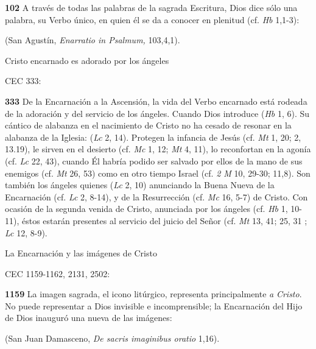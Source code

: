\textbf{102} A través de todas las palabras de la sagrada Escritura, Dios dice sólo una palabra, su Verbo único, en quien él se da a conocer en plenitud (cf. \emph{Hb} 1,1-3):

 (San Agustín, \emph{Enarratio in Psalmum,} 103,4,1).

Cristo encarnado es adorado por los ángeles

CEC 333:

\textbf{333} De la Encarnación a la Ascensión, la vida del Verbo encarnado está rodeada de la adoración y del servicio de los ángeles. Cuando Dios introduce  (\emph{Hb} 1, 6). Su cántico de alabanza en el nacimiento de Cristo no ha cesado de resonar en la alabanza de la Iglesia:  (\emph{Lc} 2, 14). Protegen la infancia de Jesús (cf. \emph{Mt} 1, 20; 2, 13.19), le sirven en el desierto (cf. \emph{Mc} 1, 12; \emph{Mt} 4, 11), lo reconfortan en la agonía (cf. \emph{Lc} 22, 43), cuando Él habría podido ser salvado por ellos de la mano de sus enemigos (cf. \emph{Mt} 26, 53) como en otro tiempo Israel (cf. \emph{2 M} 10, 29-30; 11,8). Son también los ángeles quienes  (\emph{Lc} 2, 10) anunciando la Buena Nueva de la Encarnación (cf. \emph{Lc} 2, 8-14), y de la Resurrección (cf. \emph{Mc} 16, 5-7) de Cristo. Con ocasión de la segunda venida de Cristo, anunciada por los ángeles (cf. \emph{Hb} 1, 10-11), éstos estarán presentes al servicio del juicio del Señor (cf. \emph{Mt} 13, 41; 25, 31 ; \emph{Lc} 12, 8-9).

La Encarnación y las imágenes de Cristo

CEC 1159-1162, 2131, 2502:

\textbf{1159} La imagen sagrada, el icono litúrgico, representa principalmente \emph{a} \emph{Cristo}. No puede representar a Dios invisible e incomprensible; la Encarnación del Hijo de Dios inauguró una nueva  de las imágenes:

 (San Juan Damasceno, \emph{De sacris imaginibus oratio} 1,16).

